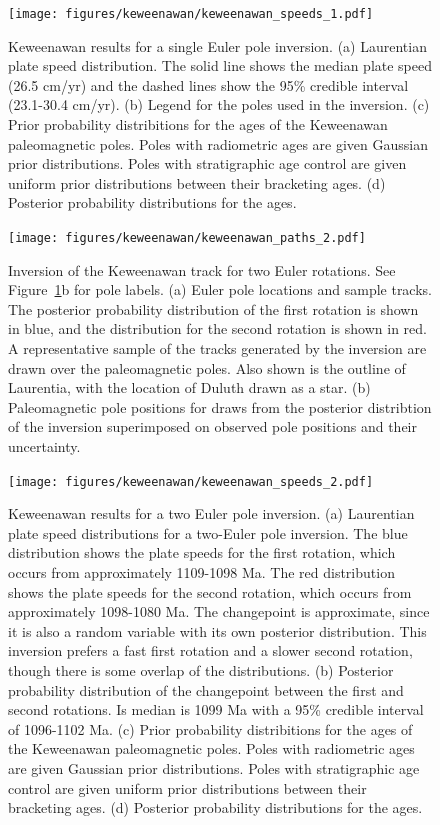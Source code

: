 \documentclass[preprint,12pt,authoryear]{elsarticle}
\begin{document}
\begin{figure}
\texttt{[image: figures/keweenawan/keweenawan\_speeds\_1.pdf]}
\caption[Keweenawan results for a single Euler pole inversion]{ Keweenawan results for a single Euler pole inversion.
(a) Laurentian plate speed distribution. The solid line shows the median plate speed (26.5 cm/yr) and the dashed lines show the 95\% credible interval (23.1-30.4 cm/yr).
(b) Legend for the poles used in the inversion.
(c) Prior probability distribitions for the ages of the Keweenawan paleomagnetic poles. Poles with radiometric ages are given Gaussian prior distributions. Poles with stratigraphic age control are given uniform prior distributions between their bracketing ages. 
(d) Posterior probability distributions for the ages.}
\label{fig:keweenawan_speeds_1}
\end{figure}

\begin{figure}
\texttt{[image: figures/keweenawan/keweenawan\_paths\_2.pdf]}
\caption[Inversion of the Keweenawan track for two Euler rotations]{Inversion of the Keweenawan track for two Euler rotations. See Figure~\ref{fig:keweenawan_speeds_1}b for pole labels.
(a) Euler pole locations and sample tracks. The posterior probability distribution of the first rotation is shown in blue, and the distribution for the second rotation is shown in red.
A representative sample of the tracks generated by the inversion are drawn over the paleomagnetic poles. 
Also shown is the outline of Laurentia, with the location of Duluth drawn as a star.
(b) Paleomagnetic pole positions for draws from the posterior distribtion of the inversion superimposed on observed pole positions and their uncertainty.}
\label{fig:keweenawan_paths_2}
\end{figure}

\begin{figure}
\texttt{[image: figures/keweenawan/keweenawan\_speeds\_2.pdf]}
\caption[Keweenawan results for a two Euler pole inversion]{ Keweenawan results for a two Euler pole inversion.
(a) Laurentian plate speed distributions for a two-Euler pole inversion. The blue distribution shows the plate speeds for the first rotation, which occurs from approximately 1109-1098 Ma. The red distribution shows the plate speeds for the second rotation, which occurs from approximately 1098-1080 Ma. The changepoint is approximate, since it is also a random variable with its own posterior distribution. This inversion prefers a fast first rotation and a slower second rotation, though there is some overlap of the distributions.
(b) Posterior probability distribution of the changepoint between the first and second rotations. Is median is 1099 Ma with a 95\% credible interval of 1096-1102 Ma.
(c) Prior probability distribitions for the ages of the Keweenawan paleomagnetic poles. Poles with radiometric ages are given Gaussian prior distributions. Poles with stratigraphic age control are given uniform prior distributions between their bracketing ages. 
(d) Posterior probability distributions for the ages.}
\label{fig:keweenawan_speeds_2}
\end{figure}
\end{document}
